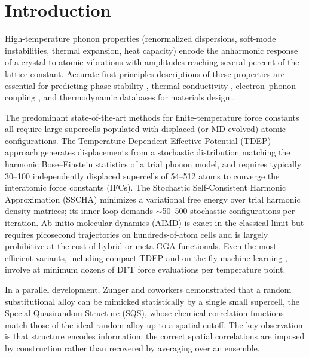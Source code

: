 \documentclass[aps,prb,reprint,amsmath,amssymb,floatfix]{revtex4-2}
\begin{document}
\maketitle

\section{Introduction}\label{introduction}

High-temperature phonon properties (renormalized dispersions, soft-mode
instabilities, thermal expansion, heat capacity) encode the anharmonic
response of a crystal to atomic vibrations with amplitudes reaching
several percent of the lattice constant. Accurate first-principles
descriptions of these properties are essential for predicting phase
stability \cite{ref1}, thermal conductivity \cite{ref2},
electron--phonon coupling \cite{ref3}, and thermodynamic databases for
materials design \cite{ref4}.

The predominant state-of-the-art methods for finite-temperature force
constants all require large supercells populated with displaced (or
MD-evolved) atomic configurations. The Temperature-Dependent Effective
Potential (TDEP) approach \cite{ref5,ref6} generates displacements from
a stochastic distribution matching the harmonic Bose--Einstein
statistics of a trial phonon model, and requires typically 30--100
independently displaced supercells of 54--512 atoms to converge the
interatomic force constants (IFCs). The Stochastic Self-Consistent
Harmonic Approximation (SSCHA) \cite{ref7,ref8} minimizes a variational
free energy over trial harmonic density matrices; its inner loop demands
$\sim$50--500 stochastic configurations per iteration. Ab initio
molecular dynamics (AIMD) \cite{ref9} is exact in the classical limit
but requires picosecond trajectories on hundreds-of-atom cells and is
largely prohibitive at the cost of hybrid or meta-GGA functionals. Even
the most efficient variants, including compact TDEP \cite{ref10} and
on-the-fly machine learning \cite{ref11}, involve at minimum dozens of
DFT force evaluations per temperature point.

In a parallel development, Zunger and coworkers \cite{ref12}
demonstrated that a random substitutional alloy can be mimicked
statistically by a single small supercell, the Special Quasirandom
Structure (SQS), whose chemical correlation functions match those of the
ideal random alloy up to a spatial cutoff. The key observation is that
structure encodes information: the correct spatial correlations are
imposed by construction rather than recovered by averaging over an
ensemble.
\end{document}
